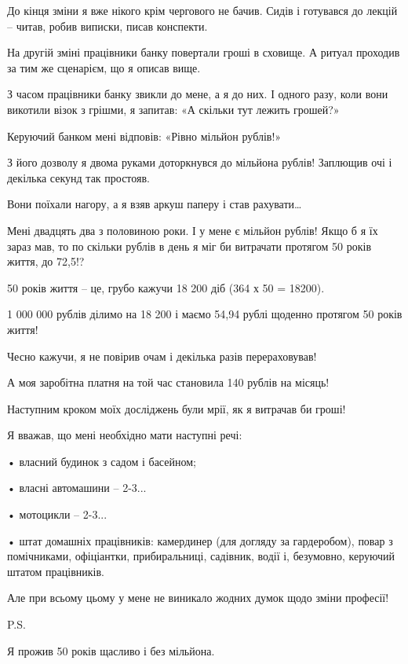 До кінця зміни я вже нікого крім чергового не бачив. Сидів і готувався до
лекцій – читав, робив виписки, писав конспекти. 

На другій зміні працівники банку повертали гроші в сховище. А ритуал проходив
за тим же сценарієм, що я описав вище.

З часом працівники банку звикли до мене, а я до них. І одного разу, коли вони
викотили візок з грішми, я запитав: «А скільки тут лежить грошей?»

Керуючий банком мені відповів: «Рівно мільйон рублів!» 

З його дозволу я двома руками доторкнувся до мільйона рублів! Заплющив очі і
декілька секунд так простояв.

Вони поїхали нагору, а я взяв аркуш паперу і став рахувати…

Мені двадцять два з половиною роки. І у мене є мільйон рублів! Якщо б я їх
зараз мав, то по скільки рублів в день я міг би витрачати протягом 50 років
життя, до 72,5!?

50 років життя – це, грубо кажучи 18 200 діб (364 х 50 = 18200).

1 000 000 рублів ділимо на 18 200 і маємо 54,94 рублі щоденно протягом 50 років
життя!

Чесно кажучи, я не повірив очам і декілька разів перераховував!

А моя заробітна платня на той час становила 140 рублів на місяць!

Наступним кроком моїх досліджень були мрії, як я витрачав би гроші!

Я вважав, що мені необхідно мати наступні речі:

• власний будинок з садом і басейном;

• власні автомашини – 2-3...

• мотоцикли – 2-3...

• штат домашніх працівників: камердинер (для догляду за гардеробом), повар з
помічниками, офіціантки, прибиральниці, садівник, водії і, безумовно, керуючий
штатом працівників.

Але при всьому цьому у мене не виникало жодних думок щодо зміни професії!

P.S.

Я прожив 50 років щасливо і без мільйона.

